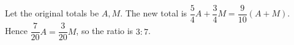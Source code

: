 Let the original totals be $ A,M $. The new total is $\dfrac{5}{4}A+\dfrac{3}{4}M=\dfrac{9}{10}(A+M)$. Hence $\dfrac{7}{20}A=\dfrac{3}{20}M $, so the ratio is $\boxed{3:7}$.
